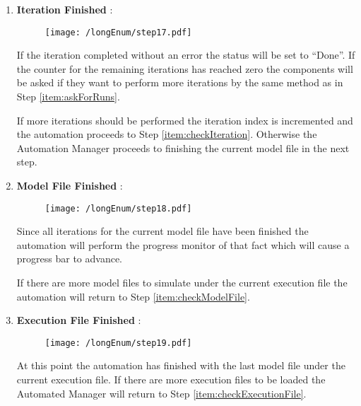 \begin{enumerate}
The cleanup will start by terminating the thread that watches for timeouts during the currently executing
step and user cancellations. This has to be done because the wrap-up code should not be interrupted.

After that all Automated Producers\footnote{Section \ref{section:AutomatedProducer}} will be asked to
publish their results. The accumulated results together with the index of the last step will be
forwarded to the view in order to update the table\footnote{Section \ref{section:AutoView}}.

As soon as the results were retrieved from all components the current execution inside the Execution
Manager is no longer needed. The Automation Manager triggers the synchronous stop of the paused 
execution. This will cause the Execution Manager to terminate all worker threads and get ready for 
the next execution that has to be run.

 \item \label{item:iterationDone} \textbf{Iteration Finished} :
\begin{figure}[H]
  \centering
  \texttt{[image: /longEnum/step17.pdf]}
\end{figure}
If the iteration completed without an error the status will be
set to ``Done''. If the counter for the remaining iterations has reached zero the components will
be asked if they want to perform more iterations by the same method as in Step \ref{item:askForRuns}.

If more iterations should be performed the iteration index is incremented and the automation proceeds
to Step \ref{item:checkIteration}. Otherwise the Automation Manager proceeds to finishing the 
current model file in the next step.

 \item \label{item:modelFileDone} \textbf{Model File Finished} :
\begin{figure}[H]
  \centering
  \texttt{[image: /longEnum/step18.pdf]}
\end{figure}
Since all iterations for the current model file have been finished
the automation will perform the progress monitor of that fact which will cause a progress bar to
advance.

If there are more model files to simulate under the current execution file the automation will
return to Step \ref{item:checkModelFile}.

 \item \label{item:executionFileDone} \textbf{Execution File Finished} :
\begin{figure}[H]
  \centering
  \texttt{[image: /longEnum/step19.pdf]}
\end{figure}
At this point the automation has finished with the last model file
under the current execution file. If there are more execution files to be loaded the Automated Manager
will return to Step \ref{item:checkExecutionFile}.


\end{enumerate}
